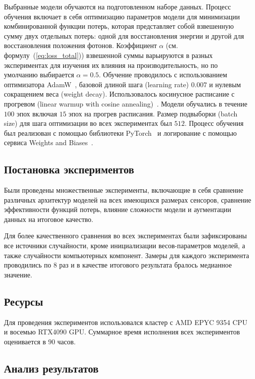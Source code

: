 \documentclass[a4paper,12pt]{extarticle}
\begin{document}
Выбранные модели обучаются на подготовленном наборе данных. Процесс обучения включает в себя оптимизацию параметров модели для минимизации комбинированной функции потерь, которая представляет собой взвешенную сумму двух отдельных потерь: одной для восстановления энергии и другой для восстановления положения фотонов. Коэффициент $\alpha$ (см. формулу~(\ref{eq:loss_total})) взвешенной суммы варьируются в разных экспериментах для изучения их влияния на производительность, но по умолчанию выбирается $\alpha = 0.5$. Обучение проводилось с использованием оптимизатора AdamW~\cite{loshchilov2019decoupled}, базовой длиной шага (learning rate) $0.007$ и нулевым сокращением веса (weight decay). Использовалось косинусное расписание с прогревом (linear warmup with cosine annealing)~\cite{dosovitskiy2021image}. Модели обучались в течение $100$ эпох включая $15$ эпох на прогрев расписания. Размер подвыборки (batch size) для шага оптимизации во всех экспериментах был $512$. Процесс обучения был реализован с помощью библиотеки PyTorch~\cite{paszke2019pytorch} и логирование с помощью сервиса Weights and Biases~\cite{wandb}.

\subsection{Постановка экспериментов}

Были проведены множественные эксперименты, включающие в себя сравнение различных архитектур моделей на всех имеющихся размерах сенсоров, сравнение эффективности функций потерь, влияние сложности модели и аугментации данных на итоговое качество.

Для более качественного сравнения во всех экспериментах были зафиксированы все источники случайности, кроме инициализации весов-параметров моделей, а также случайности компьютерных компонент. Замеры для каждого эксперимента проводились по $8$ раз и в качестве итогового результата бралось медианное значение.

\subsection{Ресурсы}

Для проведения экспериментов использовался кластер с AMD EPYC 9354 CPU и восемью RTX4090 GPU. Суммарное время исполнения всех экспериментов оценивается в $90$ часов.

\subsection{Анализ результатов}
\end{document}

